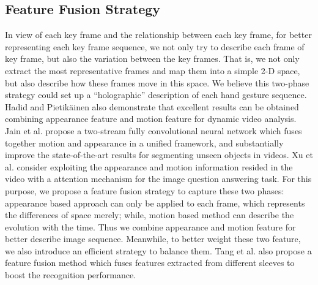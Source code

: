 \documentclass[5p]{elsarticle}
\begin{document}
\subsection{Feature Fusion Strategy}
In view of each key frame and the relationship between each key frame, for better representing each key frame sequence, we not only try to describe each frame of key frame, but also the variation between the key frames.
That is, we not only extract the most representative frames and map them into a simple 2-D space, but also describe how these frames move in this space.
We believe this two-phase strategy could set up a ``holographic'' description of each hand gesture sequence.
Hadid and Pietik{\"a}inen \cite{hadid2009combining} also demonstrate that excellent results can be obtained combining appearance feature and motion feature for dynamic video analysis.
Jain et al. \cite{jain2017fusionseg} propose a two-stream fully convolutional neural network which fuses together motion and appearance in a
unified framework, and substantially improve the state-of-the-art results for segmenting unseen objects in videos.
Xu et al. \cite{xu2017video}  consider exploiting the appearance and motion information resided in the video with a attention
mechanism for the image question answering task.
For this purpose, we propose a feature fusion strategy to capture these two phases: appearance based approach can only be applied to each frame, which represents the differences of space merely; while, motion based method can describe the evolution with the time.
Thus we combine appearance and motion feature for better describe image sequence.
Meanwhile, to better weight these two feature, we also introduce an efficient strategy to balance them.
Tang et al.  \cite{tang2018gesturegan} also propose a feature fusion method which fuses features extracted from different sleeves to boost the recognition performance.
\end{document}
